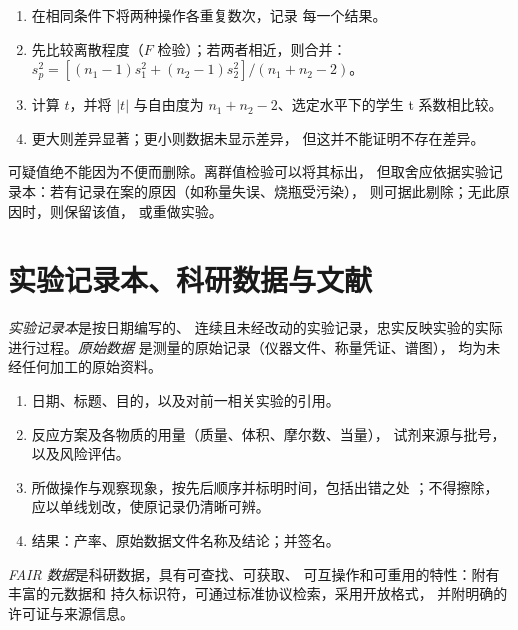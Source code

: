 \begin{method}[新方法的产率是否更高？]\label{met:b3:lab-techniques-3:compare-means}
\begin{enumerate}
  \item 在相同条件下将两种操作各重复数次，记录
        每一个结果。
  \item 先比较离散程度（$F$ 检验）；若两者相近，则合并：
        $s_p^2 = [(n_1 - 1)s_1^2 + (n_2 - 1)s_2^2]/(n_1 + n_2 - 2)$。
  \item 计算 $t$，并将 $|t|$ 与自由度为
        $n_1 + n_2 - 2$、选定水平下的学生 t 系数相比较。
  \item 更大则差异显著；更小则数据未显示差异，
        但这并不能证明不存在差异。
\end{enumerate}
\end{method}

可疑值绝不能因为不便而删除。离群值检验可以将其标出，
但取舍应依据实验记录本：若有记录在案的原因（如称量失误、烧瓶受污染），
则可据此剔除；无此原因时，则保留该值，
或重做实验。

\section{实验记录本、科研数据与文献}

\begin{definition}[实验记录本与原始数据]\label{def:b3:lab-techniques-3:notebook}
\emph{实验记录本}是按日期编写的、
连续且未经改动的实验记录，忠实反映实验的实际进行过程。\emph{原始数据}
是测量的原始记录（仪器文件、称量凭证、谱图），
均为未经任何加工的原始资料。
\end{definition}

\begin{method}[撰写实验记录条目]\label{met:b3:lab-techniques-3:notebook}
\begin{enumerate}
  \item 日期、标题、目的，以及对前一相关实验的引用。
  \item 反应方案及各物质的用量（质量、体积、摩尔数、当量），
        试剂来源与批号，以及风险评估。
  \item 所做操作与观察现象，按先后顺序并标明时间，包括出错之处
        ；不得擦除，应以单线划改，使原记录仍清晰可辨。
  \item 结果：产率、原始数据文件名称及结论；并签名。
\end{enumerate}
\end{method}

\begin{definition}[FAIR 数据]\label{def:b3:lab-techniques-3:fair}
\emph{FAIR 数据}是科研数据，具有可查找、可获取、
可互操作和可重用的特性：附有丰富的元数据和
持久标识符，可通过标准协议检索，采用开放格式，
并附明确的许可证与来源信息。
\end{definition}

